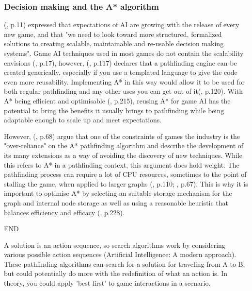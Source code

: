 \documentclass[10pt]{article}
\begin{document}
\subsubsection{Decision making and the A* algorithm}

\citeauthor{orkin2003applying} (\citeyear{orkin2003applying}, p.11) expressed that expectations of AI are growing with the release of every new game, and that "we need to look toward more structured, formalized solutions to creating scalable, maintainable and re-usable decision making systems". Game AI techniques used in most games do not contain the scalability \citeauthor{orkin2003applying} envisions (\cite{laird2001human}, p.17), however, \citeauthor{higgins2002generic} (\citeyear{higgins2002generic}, p.117) declares that a pathfinding engine can be created generically, especially if you use a templated language to give the code even more reusability. Implementing A* in this way would allow it to be used for both regular pathfinding and any other uses you can get out of it(\cite{higgins2002generic}, p.120). With A* being efficient and optimisable (\cite{millington2019ai}, p.215), reusing A* for game AI has the potential to bring the benefits it usually brings to pathfinding while being adaptable enough to scale up and meet expectations.

However, \citeauthor{graham2003pathfinding} (\citeyear{graham2003pathfinding}, p.68) argue that one of the constraints of games the industry is the "over-reliance" on the A* pathfinding algorithm and describe the development of its many extensions as a way of avoiding the discovery of new techniques. While this refers to A* in a pathfinding context, this argument does hold weight. The pathfinding process can require a lot of CPU resources, sometimes to the point of stalling the game, when applied to larger graphs (\cite{stentz1996map}, p.110; \cite{graham2003pathfinding}, p.67). This is why it is important to optimise A* by selecting an suitable storage mechanism for the graph and internal node storage as well as using a reasonable heuristic that balances efficiency and efficacy (\cite{millington2019ai}, p.228).

END

A solution is an action sequence, so search algorithms work by considering various possible action sequences (Artificial Intelligence: A modern approach). These pathfinding algorithms can search for a solution for traveling from A to B, but could potentially do more with the redefinition of what an action is. In theory, you could apply 'best first' to game interactions in a scenario.
\end{document}
